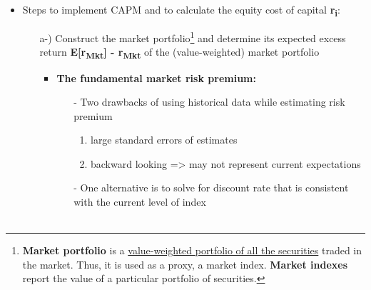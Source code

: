 \documentclass[ieeetran]{article}
\begin{document}
\begin{itemize}
\begin{itemize}
	\item Steps to implement CAPM and to calculate the equity cost of capital \textbf{r\textsubscript{\textbf{i}}}:
		\begin{itemize}
			\item[a-)] Construct the market portfolio\footnote{\textbf{Market portfolio} is a \underline{value-weighted portfolio of all the securities} traded in the market. Thus, it is used as a proxy, a market index. \textbf{Market indexes} report the value of a particular portfolio of securities.} and determine its expected excess return \textbf{E[r\textsubscript{Mkt}] - r\textsubscript{Mkt}} of the (value-weighted) market portfolio
				\begin{itemize}
				\item \textbf{The fundamental market risk premium:}
					\begin{enumerate}
						\item[-] Two drawbacks of using historical data while estimating risk premium
							\begin{enumerate}
							  \item large standard errors of estimates
								  \item backward looking => may not represent current expectations
	
							\end{enumerate}

						\item[-] One alternative is to solve for discount rate that is consistent with the current level of index \\ \\
							\large
					\end{enumerate}
				\end{itemize}
				

\end{itemize}
\end{itemize}
\end{itemize}
\end{document}
